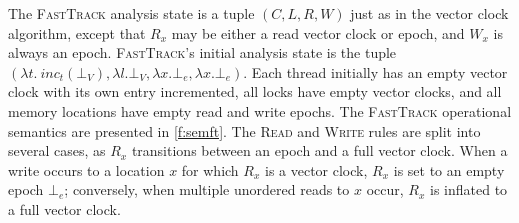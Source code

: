 \documentclass[preprint, 10pt]{sigplanconf}
\newcommand{\FT}{\textsc{FastTrack}\xspace}
\newcommand{\Rule}[1]{\textsc{#1}}
\begin{document}
The \FT analysis state is a tuple $(C, L, R, W)$ just as in the vector clock algorithm, except that $R_x$ may be either a read vector clock or epoch, and $W_x$ is always an epoch. \FT's initial analysis state is the tuple $(\lambda t.\ \mathit{inc}_t(\bot_V), \lambda l.\bot_V , \lambda x. \bot_e, \lambda x. \bot_e)$. Each thread initially has an empty vector clock with its own entry incremented, all locks have empty vector clocks, and all memory locations have empty read and write epochs. The \FT operational semantics are presented in \autoref{f:semft}. The \Rule{Read} and \Rule{Write} rules are split into several cases, as $R_x$ transitions between an epoch and a full vector clock. When a write occurs to a location $x$ for which $R_x$ is a vector clock, $R_x$ is set to an empty epoch $\bot_e$; conversely, when multiple unordered reads to $x$ occur, $R_x$ is inflated to a full vector clock.

\newcommand{\bigcell}[2][c]{%
  \begin{tabular}[#1]{@{}c@{}}#2\end{tabular}}
\end{document}
